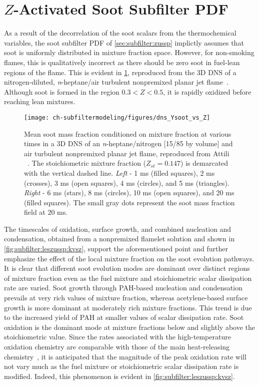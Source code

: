 \section{\texorpdfstring{$Z$}{Z}-Activated Soot Subfilter PDF}
\label{sec:subfilter:zassp}

As a result of the decorrelation of the soot scalars from the thermochemical variables, the soot subfilter PDF of \cref{sec:subfilter:zussp} implictly assumes that soot is uniformly distributed in mixture fraction space. However, for non-smoking flames, this is qualitatively incorrect as there should be zero soot in fuel-lean regions of the flame. This is evident in \cref{fig:subfilter:leszussp:ysvsz}, reproduced from the 3D DNS of a nitrogen-diluted, \textit{n}-heptane/air turbulent nonpremixed planar jet flame~\cite{attili2014}. Although soot is formed in the region $0.3 < Z < 0.5$, it is rapidly oxidized before reaching lean mixtures.

\begin{figure}[htb]
  \centering
  \texttt{[image: ch-subfiltermodeling/figures/dns\_Ysoot\_vs\_Z]}
  \caption[DNS of Turbulent Nonpremixed / Jet Flame, \texorpdfstring{$\langle Y_{\text{s}}|Z \rangle$}{<Ys|Z>} vs. \texorpdfstring{$Z$}{Z}]{Mean soot mass fraction conditioned on mixture fraction at various times in a 3D DNS of an \textit{n}-heptane/nitrogen [15/85 by volume] and air turbulent nonpremixed planar jet flame, reproduced from Attili \etal~\cite{attili2014}. The stoichiometric mixture fraction ($Z_{st} = 0.147$) is demarcated with the vertical dashed line. \textit{Left} - 1 ms (filled squares), 2 ms (crosses), 3 ms (open squares), 4 ms (circles), and 5 ms (triangles). \textit{Right} - 6 ms (stars), 8 ms (circles), 10 ms (open squares), and 20 ms (filled squares). The small gray dots represent the soot mass fraction field at 20 ms.}
  \label{fig:subfilter:leszussp:ysvsz}
\end{figure}

The timescales of oxidation, surface growth, and combined nucleation and condensation, obtained from a nonpremixed flamelet solution and shown in \cref{fig:subfilter:leszussp:kvsz}, support the aforementioned point and further emphasize the effect of the local mixture fraction on the soot evolution pathways. It is clear that different soot evolution modes are dominant over distinct regions of mixture fraction even as the fuel mixture and stoichiometric scalar dissipation rate are varied. Soot growth through PAH-based nucleation and condensation prevails at very rich values of mixture fraction, whereas acetylene-based surface growth is more dominant at moderately rich mixture fractions. This trend is due to the increased yield of PAH at smaller values of scalar dissipation rate. Soot oxidation is the dominant mode at mixture fractions below and slightly above the stoichiometric value. Since the rates associated with the high-temperature oxidation chemistry are comparable with those of the main heat-releasing chemistry~\cite{guo2016}, it is anticipated that the magnitude of the peak oxidation rate will not vary much as the fuel mixture or stoichiometric scalar dissipation rate is modified. Indeed, this phenomenon is evident in \cref{fig:subfilter:leszussp:kvsz}.

